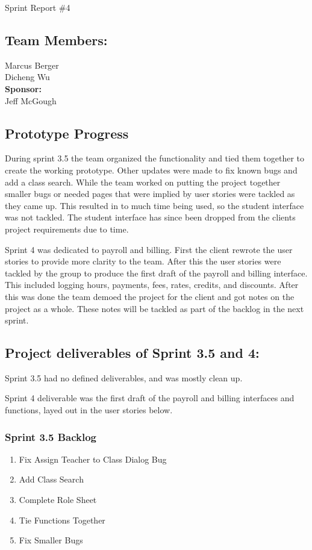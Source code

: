 Sprint Report \#4


\subsection{Team Members:}
Marcus Berger
\\Dicheng Wu\\
\textbf{Sponsor:}
\\Jeff McGough
\\

\subsection{Prototype Progress}
During sprint 3.5 the team organized the functionality and tied them together to create the working prototype. Other updates were made to fix known bugs and add a class search. While the team worked on putting the project together smaller bugs or needed pages that were implied by user stories were tackled as they came up. This resulted in to much time being used, so the student interface was not tackled. The student interface has since been dropped from the clients project requirements due to time.

Sprint 4 was dedicated to payroll and billing. First the client rewrote the user stories to provide more clarity to the team. After this the user stories were tackled by the group to produce the first draft of the payroll and billing interface. This included logging hours, payments, fees, rates, credits, and discounts. After this was done the team demoed the project for the client and got notes on the project as a whole. These notes will be tackled as part of the backlog in the next sprint.


\subsection{Project deliverables of Sprint 3.5 and 4:}
Sprint 3.5 had no defined deliverables, and was mostly clean up.

Sprint 4 deliverable was the first draft of the payroll and billing interfaces and functions, layed out in the user stories below.



\subsubsection{Sprint 3.5 Backlog}

\begin{enumerate}
\item Fix Assign Teacher to Class Dialog Bug
\item Add Class Search
\item Complete Role Sheet
\item Tie Functions Together
\item Fix Smaller Bugs
\end{enumerate}

